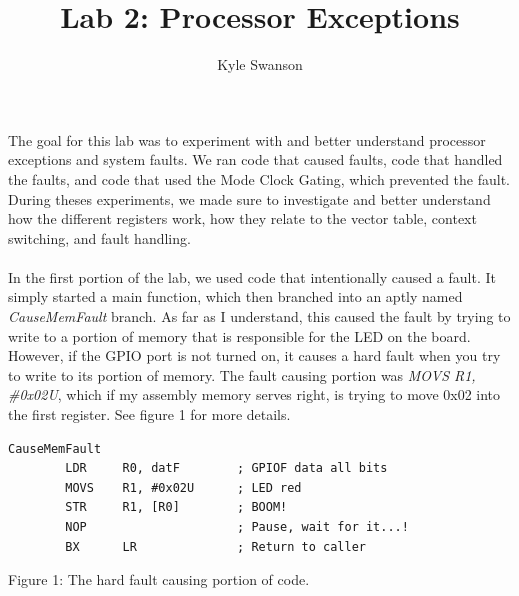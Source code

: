 \documentclass[12pt,a4paper]{report}
\author{Kyle Swanson}
\title{Lab 2: Processor Exceptions }
\begin{document}
\maketitle

\paragraph{}
The goal for this lab was to experiment with and better understand processor exceptions and system faults. We ran code that caused faults, code that handled the faults, and code that used the Mode Clock Gating, which prevented the fault. During theses experiments, we made sure to investigate and better understand how the different registers work, how they relate to the vector table, context switching, and fault handling. 

\paragraph{}
In the first portion of the lab, we used code that intentionally caused a fault. It simply started a main function, which then branched into an aptly named \emph{CauseMemFault} branch. As far as I understand, this caused the fault by trying to write to a portion of memory that is responsible for the LED on the board. However, if the GPIO port is not turned on, it causes a hard fault when you try to write to its portion of memory. The fault causing portion was \emph{MOVS    R1, \#0x02U}, which if my assembly memory serves right, is trying to move 0x02 into the first register. See figure 1 for more details. 

\medskip 

\lstset{language=[x86masm]Assembler}
\begin{lstlisting}
CauseMemFault
        LDR     R0, datF        ; GPIOF data all bits
        MOVS    R1, #0x02U      ; LED red
        STR     R1, [R0]        ; BOOM!
        NOP                     ; Pause, wait for it...!
        BX      LR              ; Return to caller
\end{lstlisting}	
\begin{center}
\small{Figure 1: The hard fault causing portion of code.}
\end{center}
\end{document}
